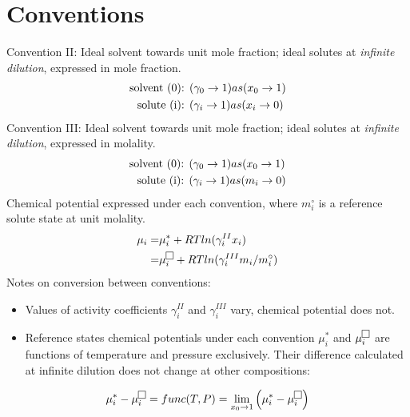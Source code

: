 \documentclass[twocolumn]{article}
\begin{document}
\section{Conventions} %
\label{sec:section_name}
Convention II: Ideal solvent towards unit mole fraction; ideal solutes at \textit{infinite dilution}, expressed in mole fraction. \cite{Denbigh1968} \\
\begin{equation}
\begin{aligned}
\textnormal{solvent (0): } & (\gamma_0 \rightarrow 1) as  (x_0 \rightarrow 1)\\
\textnormal{solute (i): } & (\gamma_i \rightarrow 1) as (x_i \rightarrow 0)
\end{aligned}
\end{equation}
Convention III: Ideal solvent towards unit mole fraction; ideal solutes at \textit{infinite dilution}, expressed in molality. \\
\begin{equation}
\begin{aligned}
\textnormal{solvent (0): } & (\gamma_0 \rightarrow 1) as  (x_0 \rightarrow 1)\\
\textnormal{solute (i): } & (\gamma_i \rightarrow 1) as (m_i \rightarrow 0)
\end{aligned}
\end{equation}
Chemical potential expressed under each convention, where $m_i^{\circ}$ is a reference solute state at unit molality.
\begin{equation}
\begin{aligned}
\mu_i = & \mu_i^{*} + RTln(\gamma_i^{II} x_i) \\
	=	& \mu_i^{\fbox{}} + RTln(\gamma_i^{III} m_i/m_i^{\circ})
\end{aligned}
\end{equation}
Notes on conversion between conventions: 
\begin{itemize}
\item Values of activity coefficients $\gamma_i^{II}$ and $\gamma_i^{III}$ vary, chemical potential does not.
\item Reference states chemical potentials under each convention $\mu_i^{*}$ and $\mu_i^{\fbox{}}$  are functions of temperature and pressure exclusively. Their difference calculated at infinite dilution does not change at other compositions:
\end{itemize}
\[
\mu_i^{*} - \mu_i^{\fbox{}}  =  func(T,P) =  \lim_{x_0 \to 1} \left( \mu_i^{*} - \mu_i^{\fbox{}}\right) 
\]
\end{document}
